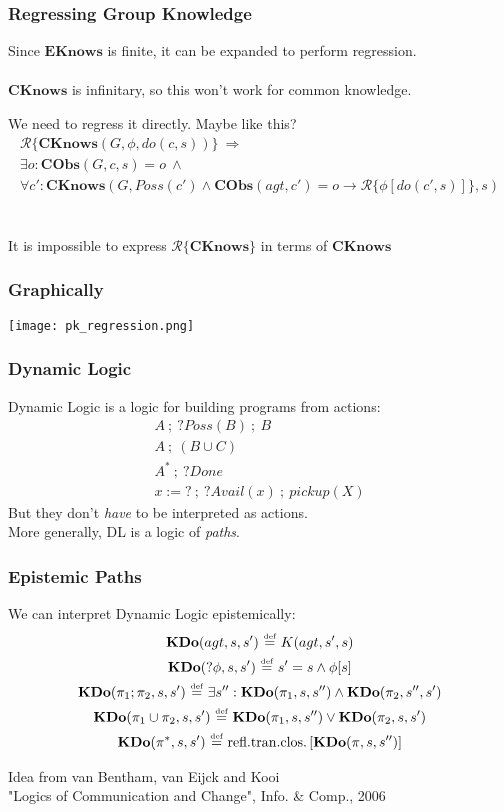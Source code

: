 \documentclass{beamer}
\newcommand{\isdef}{\hbox{$\stackrel{\mbox{\tiny def}}{=}$}}
\begin{document}
\begin{frame}
\frametitle{Regressing Group Knowledge}
Since $\mathbf{EKnows}$ is finite, it can be expanded to perform regression.
\ \\
\ \\
$\mathbf{CKnows}$ is infinitary, so this won't work for common knowledge.

We need to regress it directly.  Maybe like this?
\begin{multline*}
\mathcal{R}\{\mathbf{CKnows}(G,\phi,do(c,s))\}\ \Rightarrow \\
\exists o: \mathbf{CObs}(G,c,s)=o\ \wedge\\
\forall c': \mathbf{CKnows}(G,Poss(c') \wedge \mathbf{CObs}(agt,c')=o \rightarrow \mathcal{R}\{\phi[do(c',s)]\},s)
\end{multline*}
\ \\
\ \\
\pause
It is \alert{impossible} to express $\mathcal{R}\{\mathbf{CKnows}\}$ in terms of $\mathbf{CKnows}$
\end{frame}

\begin{frame}
\frametitle{Graphically}
\begin{center}
  \texttt{[image: pk\_regression.png]}
\end{center}
\end{frame}

\begin{frame}
\frametitle{Dynamic Logic}
Dynamic Logic is a logic for building programs from actions:
\begin{gather*}
A\ ;\ ?Poss(B)\ ;\ B \\
A\ ;\ (B \cup C) \\
A^*\ ;\ ?Done \\
x:=?\ ;\ ?Avail(x)\ ;\ pickup(X)
\end{gather*}
But they don't \emph{have} to be interpreted as actions.\\
More generally, DL is a logic of \emph{paths}.
\end{frame}

\begin{frame}
\frametitle{Epistemic Paths}
We can interpret Dynamic Logic epistemically:
\begin{gather*}
\mathbf{KDo}(agt,s,s')\ \isdef\ K(agt,s',s)\\
\mathbf{KDo}(?\phi,s,s')\ \isdef\ s'=s \wedge \phi[s]\\
\mathbf{KDo}(\pi_1;\pi_2,s,s')\ \isdef\ \exists s'': \mathbf{KDo}(\pi_1,s,s'') \wedge \mathbf{KDo}(\pi_2,s'',s')\\
\mathbf{KDo}(\pi_1\cup\pi_2,s,s')\ \isdef\ \mathbf{KDo}(\pi_1,s,s'') \vee \mathbf{KDo}(\pi_2,s,s')\\
\mathbf{KDo}(\pi^*,s,s')\ \isdef\ \mathrm{refl. tran. clos.}\left[\mathbf{KDo}(\pi,s,s'')\right]\\
\end{gather*}

Idea from van Bentham, van Eijck and Kooi\\
"Logics of Communication and Change", Info. \& Comp., 2006
\end{frame}
\end{document}
